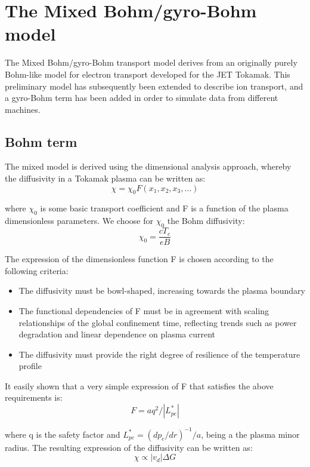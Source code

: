 \section{The Mixed Bohm/gyro-Bohm model}

The Mixed Bohm/gyro-Bohm transport model derives from an
originally purely Bohm-like model for electron transport
developed for the JET Tokamak\cite{tar94}. This preliminary model has 
subsequently been extended to describe ion transport\cite{erb95},
and a gyro-Bohm term has been added in order to simulate data from
different machines\cite{erb98}.  

\subsection{Bohm term}

The mixed model is derived using the dimensional analysis approach,
whereby the diffusivity in a Tokamak plasma can be written as:\\
\[ \chi = \chi_0 F(x_1, x_2, x_3, ...)\]

where $\chi_0$ is some basic transport coefficient and F is a function
of the plasma dimensionless parameters. We choose for $\chi_0$ the Bohm diffusivity:\\
\[ \chi_0 = \frac{cT_e}{eB}\]

The expression of the dimensionless function F is chosen according to
the following criteria:\
\begin{itemize}
\item{The diffusivity must be bowl-shaped, increasing towards the plasma
boundary}
\item{The functional dependencies of F must be in agreement with 
scaling relationships of the global confinement time, reflecting
trends such as power degradation and linear dependence on plasma
current}
\item{The diffusivity must provide the right degree of resilience
of the temperature profile}
\end{itemize}

It easily shown that a very simple expression of F that satisfies
the above requirements is:\\
\[ F = aq^2/|L_{pe}^*|\]

where q is the safety factor and $L_{pe}^*=(dp_e/dr)^{-1}/a$, being a the
plasma minor radius. The resulting expression of the diffusivity
can be written as:\\
\[ \chi \propto |v_d| \Delta G\]

